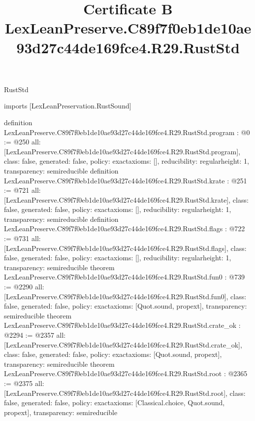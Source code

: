 \begin{lexlean}{RustStd}
\title{Certificate B LexLeanPreserve.C89f7f0eb1de10ae93d27c44de169fce4.R29.RustStd}
\begin{coremodule}
imports [LexLeanPreservation.RustSound]

definition LexLeanPreserve.C89f7f0eb1de10ae93d27c44de169fce4.R29.RustStd.program : @0 := @250 {
  all: [LexLeanPreserve.C89f7f0eb1de10ae93d27c44de169fce4.R29.RustStd.program],
  class: false,
  generated: false,
  policy: exact{axioms: []},
  reducibility: regular{height: 1},
  transparency: semireducible
}
definition LexLeanPreserve.C89f7f0eb1de10ae93d27c44de169fce4.R29.RustStd.krate : @251 := @721 {
  all: [LexLeanPreserve.C89f7f0eb1de10ae93d27c44de169fce4.R29.RustStd.krate],
  class: false,
  generated: false,
  policy: exact{axioms: []},
  reducibility: regular{height: 1},
  transparency: semireducible
}
definition LexLeanPreserve.C89f7f0eb1de10ae93d27c44de169fce4.R29.RustStd.flags : @722 := @731 {
  all: [LexLeanPreserve.C89f7f0eb1de10ae93d27c44de169fce4.R29.RustStd.flags],
  class: false,
  generated: false,
  policy: exact{axioms: []},
  reducibility: regular{height: 1},
  transparency: semireducible
}
theorem LexLeanPreserve.C89f7f0eb1de10ae93d27c44de169fce4.R29.RustStd.fun0 : @739 := @2290 {
  all: [LexLeanPreserve.C89f7f0eb1de10ae93d27c44de169fce4.R29.RustStd.fun0],
  class: false,
  generated: false,
  policy: exact{axioms: [Quot.sound, propext]},
  transparency: semireducible
}
theorem LexLeanPreserve.C89f7f0eb1de10ae93d27c44de169fce4.R29.RustStd.crate_ok : @2294 := @2357 {
  all: [LexLeanPreserve.C89f7f0eb1de10ae93d27c44de169fce4.R29.RustStd.crate_ok],
  class: false,
  generated: false,
  policy: exact{axioms: [Quot.sound, propext]},
  transparency: semireducible
}
theorem LexLeanPreserve.C89f7f0eb1de10ae93d27c44de169fce4.R29.RustStd.root : @2365 := @2375 {
  all: [LexLeanPreserve.C89f7f0eb1de10ae93d27c44de169fce4.R29.RustStd.root],
  class: false,
  generated: false,
  policy: exact{axioms: [Classical.choice, Quot.sound, propext]},
  transparency: semireducible
}


\end{coremodule}
\end{lexlean}
